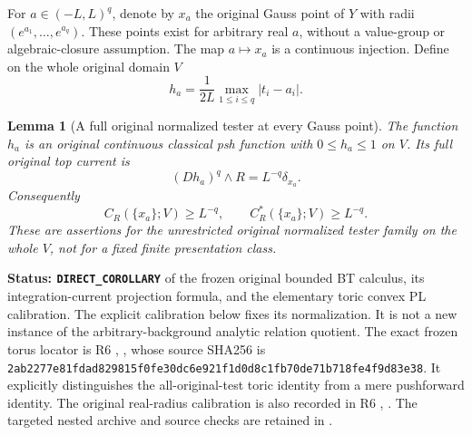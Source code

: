 \documentclass[11pt,a4paper]{article}
\numberwithin{equation}{section}
\newtheorem{lemma}[theorem]{Lemma}
\theoremstyle{definition}
\theoremstyle{remark}
\begin{document}
For $a\in(-L,L)^q$, denote by $x_a$ the original Gauss point of $Y$
with radii $(e^{a_1},\ldots,e^{a_q})$. These points exist for arbitrary
real $a$, without a value-group or algebraic-closure assumption.
The map $a\mapsto x_a$ is a continuous injection. Define on the
whole original domain $V$
\[
                      h_a=\frac{1}{2L}
                                  \max_{1\leq i\leq q}|t_i-a_i|.
 \tag{CM2}
\]

\begin{lemma}[A full original normalized tester at every Gauss point]
\label{lem:r12-gauss-singleton-full-capacity}
The function $h_a$ is an original continuous classical psh function
with $0\leq h_a\leq1$ on $V$. Its full original top current is
\[
                         (Dh_a)^q\wedge R=L^{-q}\delta_{x_a}.
 \tag{CM3}
\]
Consequently
\[
             C_R(\{x_a\};V)\geq L^{-q},\qquad
             C_R^*(\{x_a\};V)\geq L^{-q}.
 \tag{CM4}
\]
These are assertions for the unrestricted original normalized tester
family on the whole $V$, not for a fixed finite presentation class.
\end{lemma}

\noindent\textbf{Status: \texttt{DIRECT\_COROLLARY}} of the
frozen original bounded BT calculus, its integration-current
projection formula, and the elementary toric convex PL calibration.
The explicit calibration below fixes its normalization. It is not a
new instance of the arbitrary-background analytic relation quotient.
The exact frozen torus locator is R6
,
, whose source SHA256 is
{\small\nolinkurl{2ab2277e81fdad829815f0fe30dc6e921f1d0d8c1fb70de71b718fe4f9d83e38}}.
It explicitly distinguishes the all-original-test toric identity
from a mere pushforward identity. The original real-radius
calibration is also recorded in R6
,
. The targeted nested
archive and source checks are retained in
.
\end{document}
